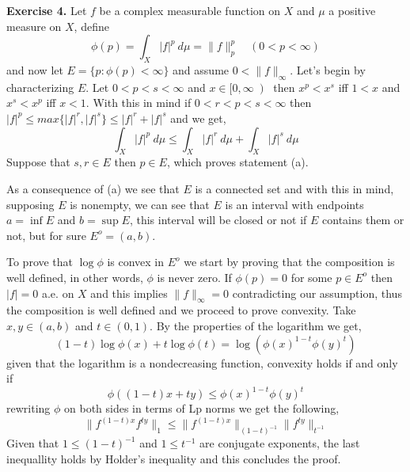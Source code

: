\documentclass{article}
\begin{document}
\bigbreak

\begin{exercise}\textbf{Exercise 4.}
    Let $f$ be a complex measurable function on $X$ and $\mu$ a positive measure on $X$, define
    \[
        \phi \left( p \right) = \int_X |f|^p\: d\mu = \|f\|_p^p \quad \left( 0 < p < \infty \right) 
    \]
    and now let $E = \{p: \phi \left( p \right) < \infty\}$ and assume $0 < \|f\|_\infty$. Let's begin by characterizing $E$. Let $0<p<s<\infty$ and $x \in [0, \infty \left)$ then $x^p < x^s$ iff $1 < x$ and $x^s < x^p$ iff $x < 1$. With this in mind if $0<r<p<s<\infty$ then $|f|^p \le max\{|f|^r,|f|^s\} \le |f|^r+|f|^s$ and we get,
    \[
        \int_X |f|^p\: d\mu \le \int_X |f|^r\: d\mu + \int_X |f|^s\: d\mu 
    \]
    Suppose that $s,r \in E$ then $p \in E$, which proves statement (a).

\bigbreak

    As a consequence of (a) we see that $E$ is a connected set and with this in mind, supposing $E$ is nonempty, we can see that $E$ is an interval with endpoints $a= \inf E$ and $b = \sup E$, this interval will be closed or not if $E$ contains them or not, but for sure $E^o= \left( a,b \right) $.

\bigbreak

    To prove that $\log \phi$ is convex in $E^o$ we start by proving that the composition is well defined, in other words, $\phi$ is never zero. If $\phi \left( p \right) = 0$ for some $p \in E^o $ then $|f|=0$ a.e. on $X$ and this implies $\|f\|_\infty = 0$ contradicting our assumption, thus the composition is well defined and we proceed to prove convexity. Take $x,y \in \left( a,b \right) $ and $t \in \left( 0,1 \right) $. By the properties of the logarithm we get,
    \[
        \left( 1-t \right) \log \phi \left( x \right) + t \log \phi \left( t \right) = \log \left( \phi \left( x\right)^{1-t} \phi \left( y \right)^t \right) 
    \]
    given that the logarithm is a nondecreasing function, convexity holds if and only if
    \[
        \phi \left( (1-t)x + ty \right) \le \phi \left( x \right)^{1-t} \phi \left( y \right)^t
    \]
    rewriting $\phi$ on both sides in terms of Lp norms we get the following,
    \[
        \|f^{ \left( 1-t \right) x} f^{ty}\|_1 \le \|f^{ \left( 1-t \right) x}\|_ {\left( 1-t \right)^{-1} } \|f^{ty}\|_{t^{-1}}   
    \]
    Given that $1 \le \left( 1-t \right)^{-1}$ and $1 \le  t^{-1} $ are conjugate exponents, the last inequallity holds by Holder's inequality and this concludes the proof.


\end{exercise}
\end{document}

